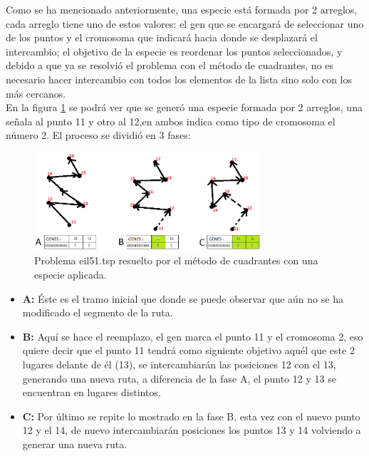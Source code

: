 \hspace*{1cm}Como se ha mencionado anteriormente, una especie está formada por 2 arreglos, cada arreglo tiene uno de estos valores: el gen que se encargará de seleccionar uno de los puntos y el cromosoma que indicará hacia donde se desplazará el intercambio; el objetivo de la especie es reordenar los puntos seleccionados, y debido a que ya se resolvió el problema con el método de cuadrantes, no es necesario hacer intercambio con todos los elementos de la lista sino solo con los más cercanos.\\

\hspace*{1cm} En la figura \ref {fig:eil51_explicado.png} se podrá ver que se generó una especie formada por 2 arreglos, una señala al punto 11 y otro al 12,en ambos indica como tipo de cromosoma el número 2. El proceso se dividió en 3 fases:
 \begin{figure}[hbtp]
        \centering
            \includegraphics[width=0.75\textwidth]{PruebasResultados/Imagenes/eil51_explicado.png}
            \caption{Problema eil51.tsp resuelto por el método de cuadrantes con una especie aplicada.}
            \label{fig:eil51_explicado.png}
    \end{figure}
\begin{itemize}
    \item \textbf{A:} Éste es el tramo inicial que donde se puede observar que aún no se ha modificado el segmento de la ruta.
    \item \textbf{B:} Aquí se hace el reemplazo, el gen marca el punto 11 y el cromosoma 2, eso quiere decir que el punto 11 tendrá  como siguiente objetivo aquél que este 2 lugares delante de él (13), se intercambiarán las posiciones 12 con el 13, generando una nueva ruta, a diferencia de la fase A, el punto 12 y 13 se encuentran en lugares distintos.
    \item \textbf{C:} Por último se repite lo mostrado en la fase B, esta vez con el nuevo punto 12 y el 14, de nuevo intercambiarán posiciones los puntos 13 y 14 volviendo a generar una nueva ruta.
\end{itemize}


